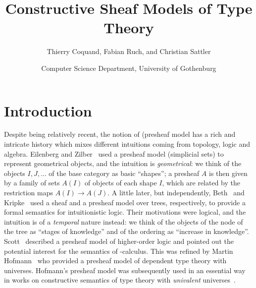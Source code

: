 \documentclass[10pt,a4paper,draft]{article}
\renewcommand{\~}{\widetilde}
\theoremstyle{definition}
\theoremstyle{remark} %
\begin{document}
\title{Constructive Sheaf Models of Type Theory}

\author{Thierry Coquand, Fabian Ruch, and Christian Sattler}
\date{Computer Science Department, University of Gothenburg}
\maketitle


\section*{Introduction}

Despite being relatively recent, the notion of (pre\discretionary{-)}{}{)}sheaf model
has a rich and intricate history which mixes different intuitions
coming from topology, logic and algebra. Eilenberg and Zilber~\cite{EilenbergZ50}
used a presheaf model (simplicial sets) to represent
geometrical objects, and the intuition is {\em geometrical}:
we think of the objects $I,J,\dots$ of the base category as basic ``shapes'';
a presheaf $A$ is then given by a family of sets $A(I)$ of objects of each shape $I$,
which are related by the restriction maps $A(I) \rightarrow A(J)$.
A little later, but independently, Beth~\cite{Beth56} and Kripke~\cite{Kripke65}
used a sheaf and a presheaf model over trees, respectively,
to provide a formal semantics for intuitionistic logic. Their motivations
were logical, and the intuition is of a {\em temporal} nature instead: we think of the objects of the node of the tree
as ``stages of knowledge'' and of the ordering as ``increase in knowledge''.
Scott~\cite{Scott80} described a presheaf model of higher\hyp{}order logic and
pointed out the potential interest for the semantics of \textlambda\hyp{}calculus.
This was refined by Martin Hofmann~\cite{Hofmann97} who provided a presheaf
model of dependent type theory with universes. Hofmann's presheaf model was subsequently used in an
essential way in works on constructive semantics of type theory with
{\em univalent} universes~\cite{CCHM15,CHM18,OrtonP16}.
\end{document}
